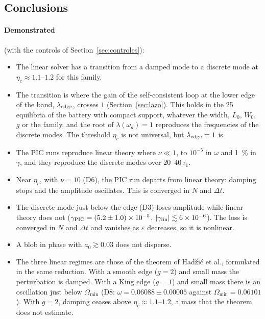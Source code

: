 \documentclass[11pt,a4paper]{article}
\begin{document}
\subsection{Conclusions}

\paragraph{Demonstrated} (with the controls of Section~\ref{sec:controles}):
\begin{itemize}
\item The linear solver has a transition from a damped mode to a discrete mode at
$\eta_c\approx1.1$--$1.2$ for this family.
\item The transition is where the gain of the self-consistent loop at the lower edge of the
band, $\lambda_{\rm edge}$, crosses $1$ (Section~\ref{sec:lazo}). This holds in the 25 equilibria
of the battery with compact support, whatever the width, $L_0$, $W_0$, $g$ or the family,
and the root of $\lambda(\omega_d)=1$ reproduces the frequencies of the discrete modes. The
threshold $\eta_c$ is not universal, but $\lambda_{\rm edge}=1$ is.
\item The PIC runs reproduce linear theory where $\nu\ll1$, to $10^{-5}$ in $\omega$ and
\SI{1}{\%} in $\gamma$, and they reproduce the discrete modes over $20$--$40\,\tau_1$.
\item Near $\eta_c$, with $\nu=10$ (D6), the PIC run departs from linear theory: damping
stops and the amplitude oscillates. This is converged in $N$ and $\Delta t$.
\item The discrete mode just below the edge (D3) loses amplitude while linear theory does
not ($\gamma_{\rm PIC}=(5.2\pm1.0)\times10^{-5}$, $|\gamma_{\rm lin}|\lesssim6\times10^{-6}$). The loss is
converged in $N$ and $\Delta t$ and vanishes as $\varepsilon$ decreases, so it is nonlinear.
\item A blob in phase with $a_0\gtrsim0.03$ does not disperse.
\item The three linear regimes are those of the theorem of Hadžić et al., formulated in the
same reduction. With a smooth edge ($g=2$) and small mass the perturbation is damped.
With a King edge ($g=1$) and small mass there is an oscillation just below $\Omega_{\min}$
(D8: $\omega=0.06088\pm0.00005$ against $\Omega_{\min}=0.06101$). With $g=2$, damping ceases
above $\eta_c\approx1.1$--$1.2$, a mass that the theorem does not estimate.
\end{itemize}
\end{document}
